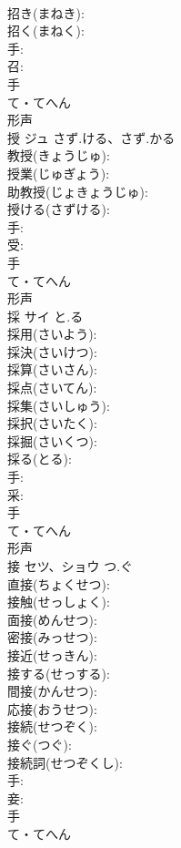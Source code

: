 \documentclass[8pt]{extreport}
\begin{document}
\begin{CJK}{UTF8}{min}
\\	招き(まねき): 
\\	招く(まねく): 
\\	手: 
\\	召: 
\\	手	
\\	て・てへん	
\\	形声 
\\	授	ジュ	さず.ける、さず.かる		
\\	教授(きょうじゅ): 
\\	授業(じゅぎょう): 
\\	助教授(じょきょうじゅ): 
\\	授ける(さずける): 
\\	手: 
\\	受: 
\\	手	
\\	て・てへん	
\\	形声 
\\	採	サイ	と.る		
\\	採用(さいよう): 
\\	採決(さいけつ): 
\\	採算(さいさん): 
\\	採点(さいてん): 
\\	採集(さいしゅう): 
\\	採択(さいたく): 
\\	採掘(さいくつ): 
\\	採る(とる): 
\\	手: 
\\	采: 
\\	手	
\\	て・てへん	
\\	形声 
\\	接	セツ、ショウ	つ.ぐ		
\\	直接(ちょくせつ): 
\\	接触(せっしょく): 
\\	面接(めんせつ): 
\\	密接(みっせつ): 
\\	接近(せっきん): 
\\	接する(せっする): 
\\	間接(かんせつ): 
\\	応接(おうせつ): 
\\	接続(せつぞく): 
\\	接ぐ(つぐ): 
\\	接続詞(せつぞくし): 
\\	手: 
\\	妾: 
\\	手	
\\	て・てへん	

\end{CJK}
\end{document}
